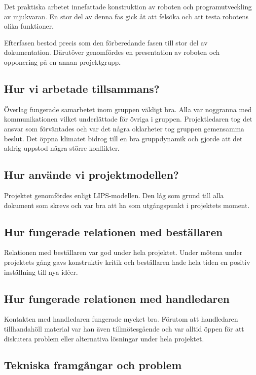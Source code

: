 \documentclass[11pt]{article}
\begin{document}
Det praktiska arbetet innefattade konstruktion av roboten och programutveckling av mjukvaran. En stor del av denna fas gick åt att felsöka och att testa robotens olika funktioner. 

Efterfasen bestod precis som den förberedande fasen till stor del av dokumentation. Därutöver genomfördes en presentation av roboten och opponering på en annan projektgrupp.

\subsection{Hur vi arbetade tillsammans?}
Överlag fungerade samarbetet inom gruppen väldigt bra. Alla var noggranna med kommunikationen vilket underlättade för övriga i gruppen. Projektledaren tog det ansvar som förväntades och var det några oklarheter tog gruppen gemensamma beslut. Det öppna klimatet bidrog till en bra gruppdynamik och gjorde att det aldrig uppstod några större konflikter.

\subsection{Hur använde vi projektmodellen?} 
Projektet genomfördes enligt LIPS-modellen. Den låg som grund till alla dokument som skrevs och var bra att ha som utgångspunkt i projektets moment. 

\subsection{Hur fungerade relationen med beställaren}
Relationen med beställaren var god under hela projektet. Under mötena under projektets gång gavs konstruktiv kritik och beställaren hade hela tiden en positiv inställning till nya idéer. 

\subsection{Hur fungerade relationen med handledaren}
Kontakten med handledaren fungerade mycket bra. Förutom att handledaren tillhandahöll material var han även  tillmötesgående och var alltid öppen för att diskutera problem eller alternativa lösningar under hela projektet.

\subsection{Tekniska framgångar och problem}
\end{document}
